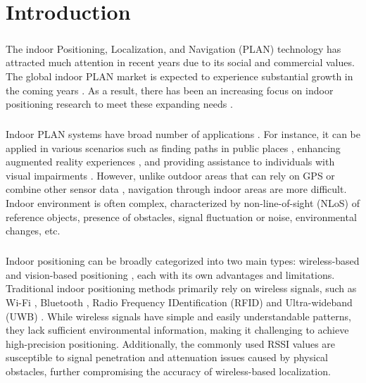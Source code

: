 \documentclass[a4paper,12pt]{report}
\begin{document}
\tableofcontents \newpage
{}
\listoftables \newpage
{}
\listoffigures \newpage



\setcounter{page}{1}

\chapter{Introduction}
\paragraph{}
The indoor Positioning, Localization, and Navigation (PLAN) technology has attracted much attention in recent years due to its social and commercial values. The global indoor PLAN market is expected to experience substantial growth in the coming years \cite{el2021indoor}. As a result, there has been an increasing focus on indoor positioning research to meet these expanding needs \cite{mendoza2019meta}.
\paragraph{}
Indoor PLAN systems have broad number of applications \cite{farahsari2022survey}. For instance, it can be applied in various scenarios such as finding paths in public places \cite{kamiya2019indoor,spachos2020ble}, enhancing augmented reality experiences \cite{ng2020design}, and providing assistance to individuals with visual impairments \cite{li2022sensing}. However, unlike outdoor areas that can rely on GPS or combine other sensor data \cite{agrawal2006real,cai2019mobile}, navigation through indoor areas are more difficult. Indoor environment is often complex, characterized by non-line-of-sight (NLoS) of reference objects, presence of obstacles, signal fluctuation or noise, environmental changes, etc.
\paragraph{}
Indoor positioning can be broadly categorized into two main types: wireless-based and vision-based positioning \cite{kunhoth2020indoor}, each with its own advantages and limitations. Traditional indoor positioning methods primarily rely on wireless signals, such as Wi-Fi \cite{wang2017cifi,zhang2020wifi,lan2022fingerprint}, Bluetooth \cite{zhuang2016smartphone,Sou2019BTrack,danics2021adaptive}, Radio Frequency IDentification (RFID) \cite{jiang2019deep,merenda2022rfid} and Ultra-wideband (UWB) \cite{poulose2020uwb,yang2022robust}. While wireless signals have simple and easily understandable patterns, they lack sufficient environmental information, making it challenging to achieve high-precision positioning. Additionally, the commonly used RSSI values are susceptible to signal penetration and attenuation issues caused by physical obstacles, further compromising the accuracy of wireless-based localization.
\end{document}
